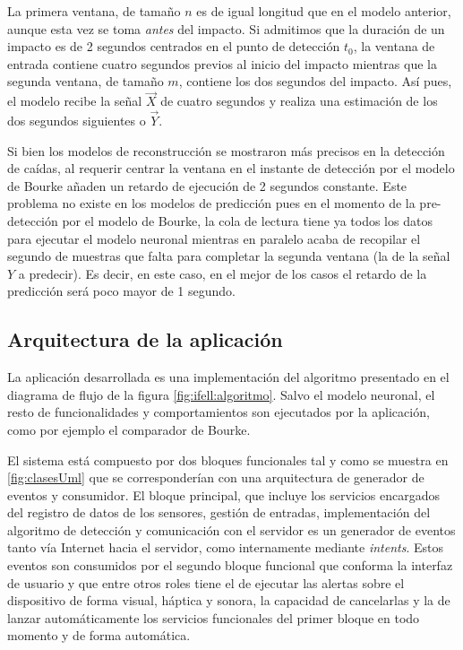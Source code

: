 La primera ventana, de tamaño $n$ es de igual longitud que en el modelo anterior, aunque esta vez se toma \emph{antes} del impacto. Si admitimos que la duración de un impacto es de 2 segundos centrados en el punto de detección $t_0$, la ventana de entrada contiene cuatro segundos previos al inicio del impacto mientras que la segunda ventana, de tamaño $m$, contiene los dos segundos del impacto. Así pues, el modelo recibe la señal $\vec{X}$ de cuatro segundos y realiza una estimación de los dos segundos siguientes o $\vec{Y}$.

Si bien los modelos de reconstrucción se mostraron más precisos en la detección de caídas, al requerir centrar la ventana en el instante de detección por el modelo de Bourke añaden un retardo de ejecución de 2 segundos constante. Este problema no existe en los modelos de predicción pues en el momento de la pre-detección por el modelo de Bourke, la cola de lectura tiene ya todos los datos para ejecutar el modelo neuronal mientras en paralelo acaba de recopilar el segundo de muestras que falta para completar la segunda ventana (la de la señal $Y$ a predecir). Es decir, en este caso, en el mejor de los casos el retardo de la predicción será poco mayor de 1 segundo. 


\subsection{Arquitectura de la aplicación}

La aplicación desarrollada es una implementación del algoritmo presentado en el diagrama de flujo de la figura \ref{fig:ifell:algoritmo}. Salvo el modelo neuronal, el resto de funcionalidades y comportamientos son ejecutados por la aplicación, como por ejemplo el comparador de Bourke.

El sistema está compuesto por dos bloques funcionales tal y como se muestra en \ref{fig:clasesUml} que se corresponderían con una arquitectura de generador de eventos y consumidor. El bloque principal, que incluye los servicios encargados del registro de datos de los sensores, gestión de entradas, implementación del algoritmo de detección y comunicación con el servidor es un generador de eventos tanto vía Internet hacia el servidor, como internamente mediante \textit{intents}. Estos eventos son consumidos por el segundo bloque funcional que conforma la interfaz de usuario y que entre otros roles tiene el de ejecutar las alertas sobre el dispositivo de forma visual, háptica y sonora, la capacidad de cancelarlas y la de lanzar automáticamente los servicios funcionales del primer bloque en todo momento y de forma automática.

